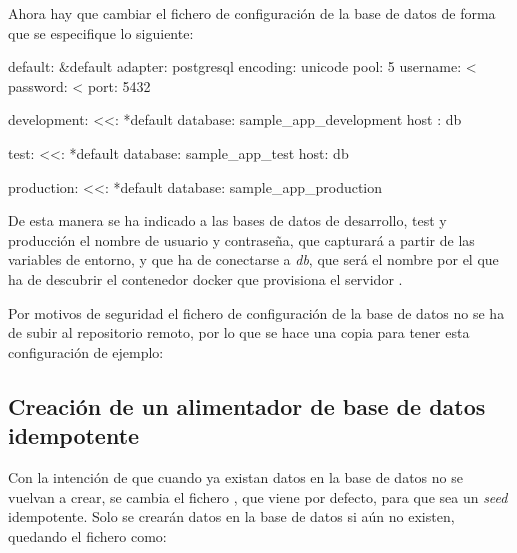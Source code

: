 Ahora hay que cambiar el fichero de configuración de la base de datos de forma que se especifique lo siguiente:

\begin{codelisting}
\label{code:database}
\begin{code}
default: &default
  adapter: postgresql
  encoding: unicode
  pool: 5
  username: <%
  password: <%
  port: 5432

development:
  <<: *default
  database: sample_app_development  
  host : db

test:
  <<: *default
  database: sample_app_test
  host: db

production:
  <<: *default
  database: sample_app_production
\end{code}
\end{codelisting}

De esta manera se ha indicado a las bases de datos de desarrollo, test y producción el nombre de usuario y contraseña, que capturará a partir de las variables de entorno, y que ha de conectarse a \textit{db}, que será el nombre por el que ha de descubrir el contenedor docker que provisiona el servidor .

Por motivos de seguridad el fichero de configuración de la base de datos no se ha de subir al repositorio remoto, por lo que se hace una copia para tener esta configuración de ejemplo:


\subsection{Creación de un alimentador de base de datos idempotente}

Con la intención de que cuando ya existan datos en la base de datos no se vuelvan a crear, se cambia el fichero , que viene por defecto, para que sea un \textit{seed} idempotente. Solo se crearán datos en la base de datos si aún no existen, quedando el fichero como:

